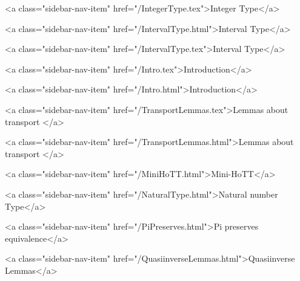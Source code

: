       
    
      
        
          <a class="sidebar-nav-item" href="/IntegerType.tex">Integer Type</a>
        
      
    
      
        
          <a class="sidebar-nav-item" href="/IntervalType.html">Interval Type</a>
        
      
    
      
        
          <a class="sidebar-nav-item" href="/IntervalType.tex">Interval Type</a>
        
      
    
      
        
          <a class="sidebar-nav-item" href="/Intro.tex">Introduction</a>
        
      
    
      
        
          <a class="sidebar-nav-item" href="/Intro.html">Introduction</a>
        
      
    
      
        
          <a class="sidebar-nav-item" href="/TransportLemmas.tex">Lemmas about transport </a>
        
      
    
      
        
          <a class="sidebar-nav-item" href="/TransportLemmas.html">Lemmas about transport </a>
        
      
    
      
        
          <a class="sidebar-nav-item" href="/MiniHoTT.html">Mini-HoTT</a>
        
      
    
      
        
          <a class="sidebar-nav-item" href="/NaturalType.html">Natural number Type</a>
        
      
    
      
        
          <a class="sidebar-nav-item" href="/PiPreserves.html">Pi preserves equivalence</a>
        
      
    
      
        
          <a class="sidebar-nav-item" href="/QuasiinverseLemmas.html">Quasiinverse Lemmas</a>
        
